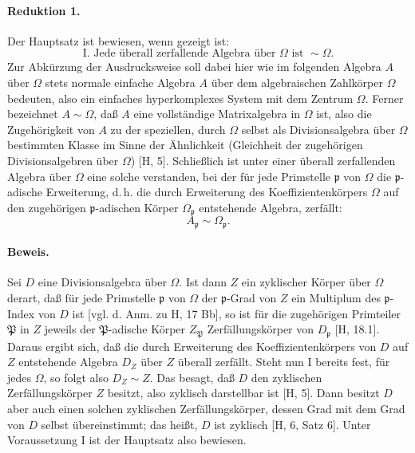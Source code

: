 \paragraph{Reduktion 1.}
Der Hauptsatz ist bewiesen, wenn gezeigt ist:
\[
\text{I. Jede überall zerfallende Algebra über }\Omega\text{ ist } \sim \Omega .
\]
Zur Abkürzung der Ausdrucksweise soll dabei hier wie im folgenden \glqq{}Algebra \(A\) über \(\Omega\)\grqq{} stets \glqq{}normale einfache Algebra \(A\) über dem algebraischen Zahlkörper \(\Omega\)\grqq{} bedeuten, also ein einfaches hyperkomplexes System mit dem Zentrum \(\Omega\). Ferner bezeichnet \(A\sim\Omega\), daß \(A\) eine vollständige Matrixalgebra in \(\Omega\) ist, also die Zugehörigkeit von \(A\) zu der speziellen, durch \(\Omega\) selbst als Divisionsalgebra über \(\Omega\) bestimmten Klasse im Sinne der Ähnlichkeit (Gleichheit der zugehörigen Divisionsalgebren über \(\Omega\)) [H, 5]. Schließlich ist unter einer überall zerfallenden Algebra über \(\Omega\) eine solche verstanden, bei der für jede Primstelle \(\mathfrak p\) von \(\Omega\) die \(\mathfrak p\)-adische Erweiterung, d.\,h. die durch Erweiterung des Koeffizientenkörpers \(\Omega\) auf den zugehörigen \(\mathfrak p\)-adischen Körper \(\Omega_{\mathfrak p}\) entstehende Algebra, zerfällt:
\[
A_{\mathfrak p}\sim \Omega_{\mathfrak p}.
\]

\paragraph{Beweis.}
Sei \(D\) eine Divisionsalgebra über \(\Omega\). Ist dann \(Z\) ein zyklischer Körper über \(\Omega\) derart, daß für jede Primstelle \(\mathfrak p\) von \(\Omega\) der \(\mathfrak p\)-Grad von \(Z\) ein Multiplum des \(\mathfrak p\)-Index von \(D\) ist [vgl. d. Anm. zu H, 17 Bb], so ist für die zugehörigen Primteiler \(\mathfrak P\) in \(Z\) jeweils der \(\mathfrak P\)-adische Körper \(Z_{\mathfrak P}\) Zerfällungskörper von \(D_{\mathfrak p}\) [H, 18.1]. Daraus ergibt sich, daß die durch Erweiterung des Koeffizientenkörpers von \(D\) auf \(Z\) entstehende Algebra \(D_Z\) über \(Z\) überall zerfällt. Steht nun I bereits fest, für jedes \(\Omega\), so folgt also \(D_Z\sim Z\). Das besagt, daß \(D\) den zyklischen Zerfällungskörper \(Z\) besitzt, also zyklisch darstellbar ist [H, 5]. Dann besitzt \(D\) aber auch einen solchen zyklischen Zerfällungskörper, dessen Grad mit dem Grad von \(D\) selbst übereinstimmt; das heißt, \(D\) ist zyklisch [H, 6, Satz 6]. Unter Voraussetzung I ist der Hauptsatz also bewiesen.

